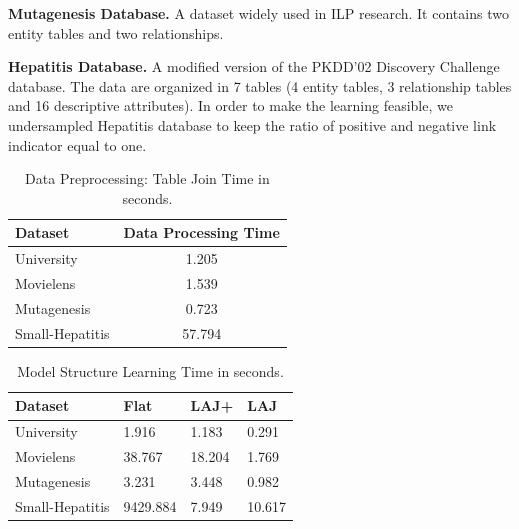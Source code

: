 \documentclass[runningheads,a4paper]{llncs}
\begin{document}
\noindent\textbf{Mutagenesis Database.} A dataset widely used in ILP research. %
It contains two entity tables and two relationships.

\noindent\textbf{Hepatitis Database.} A modified version of the PKDD'02 Discovery Challenge database. The data are organized in 7 tables (4 entity tables, 3 relationship tables and 16 descriptive attributes). In order to make the learning feasible, we undersampled Hepatitis database to keep the ratio of positive and negative link indicator equal to one. %

\begin{table} \centering
\begin{tabular}
{|p{4cm}|c|}\hline 
 \textbf{Dataset} & \textbf{Data Processing Time} \\\hline
University&1.205 \\\hline
Movielens &1.539\\\hline
Mutagenesis &0.723\\\hline
Small-Hepatitis &57.794\\\hline

\end{tabular}
\setlength{\abovecaptionskip}{10pt}
\caption{Data Preprocessing: Table Join Time  in seconds. %
 \label{table:cttimes}}

\end{table}



\begin{table} \centering
\begin{tabular}[c]
{|p{4cm}|p{2.1cm}|p{2.1cm}|p{2.1cm}|}\hline
 \textbf{Dataset} & \textbf{Flat} & \textbf{LAJ+} & \textbf{LAJ}\\\hline
University&1.916&1.183&0.291 \\\hline
Movielens &38.767& 18.204& 1.769\\\hline
Mutagenesis &3.231& 3.448& 0.982\\\hline
Small-Hepatitis &9429.884&7.949&10.617 \\\hline
\end{tabular}
\setlength{\abovecaptionskip}{10pt}
\caption{Model Structure Learning Time  in seconds.
 \label{table:runtimes}}
\end{table}
\end{document}
